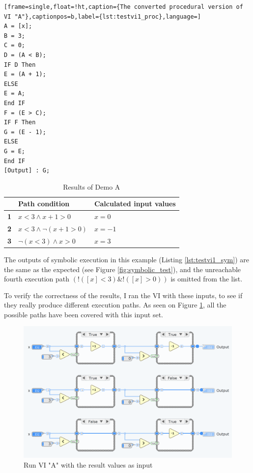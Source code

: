 \begin{lstlisting}[frame=single,float=!ht,caption={The converted procedural version of VI "A"},captionpos=b,label={lst:testvi1_proc},language=]
A = [x]; 
B = 3; 
C = 0; 
D = (A < B); 
IF D Then
E = (A + 1); 
ELSE
E = A; 
End IF
F = (E > C); 
IF F Then
G = (E - 1); 
ELSE
G = E; 
End IF
[Output] : G; 
\end{lstlisting}


\begin{table}[]
\centering

\def\arraystretch{1.5}
\begin{tabular}{|l|l|l|}
\hline
           & \textbf{Path condition}                                         & \textbf{Calculated input values} \\ \hline
\textbf{1} & $x< 3\wedge x+1> 0$ & $x=0$                              \\ \hline
\textbf{2} & $x< 3\wedge \neg (x+1> 0)$ & $x=-1 $                            \\ \hline
\textbf{3} & $\neg(x< 3)\wedge x>0$ & $x=3$                     \\ \hline
\end{tabular}
\caption{Results of Demo A}
  \label{Tab:testvi1resu}
\end{table}
The outputs of symbolic execution in this example (Listing \ref{lst:testvi1_sym}) are the same as the expected (see Figure \ref{fig:symbolic_test}), and the unreachable fourth execution path $(!([x] < 3) \& !([x] > 0))$ is omitted from the list.

To verify the correctness of the results, I ran the VI with these inputs, to see if they really produce different execution paths. As seen on Figure \ref{fig:verify1}, all the possible paths have been covered with this input set.
\begin{figure}
\centering
\includegraphics[width=140mm,keepaspectratio]{figures/verify1.png}
\caption{Run VI "A" with the result values as input} 
\label{fig:verify1}
\end{figure}

